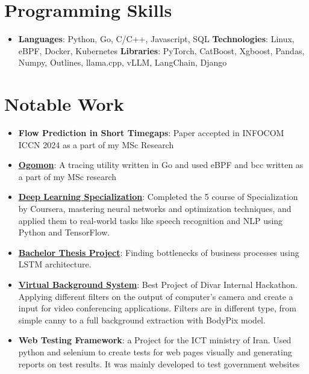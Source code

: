 \documentclass[letterpaper,11pt]{article}
\newcommand{\resumeItem}[2]{
  \item\small{
    \textbf{#1}{: #2 \vspace{-2pt}}
  }
}
\newcommand{\resumeSubItem}[2]{\resumeItem{#1}{#2}\vspace{-4pt}}
\newcommand{\resumeSubHeadingListStart}{\begin{itemize}[leftmargin=*]}
\newcommand{\resumeSubHeadingListEnd}{\end{itemize}}
\begin{document}
\section{Programming Skills}
 \resumeSubHeadingListStart
   \item{
     \textbf{Languages}{: Python, Go, C/C++, Javascript, SQL}
     \hfill
     \textbf{Technologies}{: Linux, eBPF, Docker, Kubernetes}
     \hfill
     \textbf{Libraries}{: PyTorch, CatBoost, Xgboost, Pandas, Numpy, Outlines, llama.cpp, vLLM, LangChain, Django}
   }
 \resumeSubHeadingListEnd

\section{Notable Work}
  \resumeSubHeadingListStart
    \resumeSubItem{Flow Prediction in Short Timegaps}
    {Paper accepted in INFOCOM ICCN 2024 as a part of my MSc Research}
    \resumeSubItem{\href{https://github.com/mory91/ogomon}{Ogomon}}
    {A tracing utility written in Go and used eBPF and bcc written as a part of my MSc research}
    \resumeSubItem{\href{https://www.coursera.org/account/accomplishments/specialization/certificate/T9ULQAUEZ68D}{Deep Learning Specialization}}
    {Completed the 5 course of Specialization by Coursera, mastering neural networks and optimization techniques, and applied them to real-world tasks like speech recognition and NLP using Python and TensorFlow.}
    \resumeSubItem{\href{https://github.com/mory91/bthesis}{Bachelor Thesis Project}}
    {Finding bottlenecks of business processes using LSTM architecture.}
    \resumeSubItem{\href{https://github.com/mory91/vbs}{Virtual Background System}} %
    {Best Project of Divar Internal Hackathon. Applying different filters on the output of computer's camera and create a input for video conferencing applications. Filters are in different type, from simple canny to a full background extraction with BodyPix model. }
    \resumeSubItem{Web Testing Framework}
    {a Project for the ICT ministry of Iran. Used python and selenium to create tests for web pages visually and generating reports on test results. It was mainly developed to test government websites}
  \resumeSubHeadingListEnd

\end{document}
